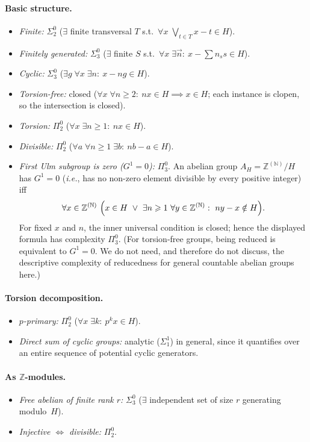 \documentclass[12pt,fleqn,a4paper]{amsart}
\renewcommand{\ge}{\geqslant}
\numberwithin{equation}{section}
\theoremstyle{definition}
\newcommand{\N}{\mathbb{N}}
\newcommand{\Z}{\mathbb{Z}}
\begin{document}
\paragraph{Basic structure.}
\begin{itemize}
\item \emph{Finite:} $\Sigma^0_2$
($\exists$ finite transversal $T$ s.t.\ $\forall x\;\bigvee_{t\in T} x-t\in H$).
\item \emph{Finitely generated:} $\Sigma^0_3$
($\exists$ finite $S$ s.t.\ $\forall x\;\exists\vec n:\ x-\sum n_ss\in H$).
\item \emph{Cyclic:} $\Sigma^0_3$
($\exists g\;\forall x\;\exists n:\ x-ng\in H$).
\item \emph{Torsion-free:} closed
($\forall x\;\forall n\ge 2:\ nx\in H\implies x\in H$;
each instance is clopen, so the intersection is closed).
\item \emph{Torsion:} $\Pi^0_2$
($\forall x\;\exists n\ge 1:\ nx\in H$).
\item \emph{Divisible:} $\Pi^0_2$
($\forall a\;\forall n\ge 1\;\exists b:\ nb-a\in H$).
\item \emph{First Ulm subgroup is zero ($G^1=0$):} $\Pi^0_3$.
An abelian group $A_H=\Z^{(\N)}/H$ has $G^1=0$ (\emph{i.e.}, has no non-zero element divisible by every positive integer) iff
\[
\forall x\in \Z^{(\N)}\ 
\Bigl(
x\in H\ \lor\ \exists n\ge 1\ \forall y\in \Z^{(\N)}:\ ny-x\notin H
\Bigr).
\]
For fixed $x$ and $n$, the inner universal condition is closed; hence the
displayed formula has complexity $\Pi^0_3$.
(For torsion-free groups, being reduced is equivalent to $G^1=0$.
We do not need, and therefore do not discuss, the descriptive complexity of
reducedness for general countable abelian groups here.)
\end{itemize}

\paragraph{Torsion decomposition.}
\begin{itemize}
\item \emph{$p$-primary:} $\Pi^0_2$ ($\forall x\;\exists k:\ p^kx\in H$).
\item \emph{Direct sum of cyclic groups:} analytic ($\Sigma^1_1$) in general, since it
quantifies over an entire sequence of potential cyclic generators.
\end{itemize}

\paragraph{As $\Z$-modules.}
\begin{itemize}
\item \emph{Free abelian of finite rank $r$:} $\Sigma^0_3$
($\exists$ independent set of size $r$ generating modulo~$H$).
\item \emph{Injective $\Leftrightarrow$ divisible:} $\Pi^0_2$.
\end{itemize}
\end{document}
